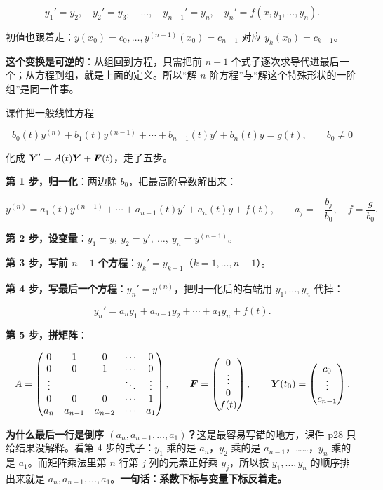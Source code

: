 \documentclass[11pt]{ctexart}
\newcommand{\mat}[1]{\begin{pmatrix}#1\end{pmatrix}}
\begin{document}
\[
y_1'=y_2,\quad y_2'=y_3,\quad\dots,\quad y_{n-1}'=y_n,\quad y_n'=f(x,y_1,\dots,y_n).
\]

初值也跟着走：$y(x_0)=c_0,\dots,y^{(n-1)}(x_0)=c_{n-1}$ 对应 $y_k(x_0)=c_{k-1}$。

\textbf{这个变换是可逆的}：从组回到方程，只需把前 $n-1$ 个式子逐次求导代进最后一个；从方程到组，就是上面的定义。所以“解 $n$ 阶方程”与“解这个特殊形状的一阶组”是同一件事。


课件把一般线性方程

\[
b_0(t)y^{(n)}+b_1(t)y^{(n-1)}+\cdots+b_{n-1}(t)y'+b_n(t)y=g(t),\qquad b_0\neq0
\]

化成 $\boldsymbol{Y}'=A(t)\boldsymbol{Y}+\boldsymbol{F}(t)$，走了五步。

\textbf{第 1 步，归一化}：两边除 $b_0$，把最高阶导数解出来：

\[
y^{(n)}=a_1(t)y^{(n-1)}+\cdots+a_{n-1}(t)y'+a_n(t)y+f(t),
\qquad a_j=-\frac{b_j}{b_0},\quad f=\frac{g}{b_0}.
\]

\textbf{第 2 步，设变量}：$y_1=y,\ y_2=y',\ \dots,\ y_n=y^{(n-1)}$。

\textbf{第 3 步，写前 $n-1$ 个方程}：$y_k'=y_{k+1}$（$k=1,\dots,n-1$）。

\textbf{第 4 步，写最后一个方程}：$y_n'=y^{(n)}$，把归一化后的右端用 $y_1,\dots,y_n$ 代掉：

\[
y_n'=a_n y_1+a_{n-1}y_2+\cdots+a_1y_n+f(t).
\]

\textbf{第 5 步，拼矩阵}：

\[
A=\begin{pmatrix}
0&1&0&\cdots&0\\
0&0&1&\cdots&0\\
\vdots& & &\ddots&\vdots\\
0&0&0&\cdots&1\\
a_n&a_{n-1}&a_{n-2}&\cdots&a_1
\end{pmatrix},
\qquad
\vect{F}=\mat{0\\ \vdots\\ 0\\ f(t)},\qquad
\vect{Y}(t_0)=\mat{c_0\\ \vdots\\ c_{n-1}}.
\]

\textbf{为什么最后一行是倒序 $(a_n,a_{n-1},\dots,a_1)$？}这是最容易写错的地方，课件 p28 只给结果没解释。看第 4 步的式子：$y_1$ 乘的是 $a_n$，$y_2$ 乘的是 $a_{n-1}$，……，$y_n$ 乘的是 $a_1$。而矩阵乘法里第 $n$ 行第 $j$ 列的元素正好乘 $y_j$，所以按 $y_1,\dots,y_n$ 的顺序排出来就是 $a_n,a_{n-1},\dots,a_1$。\textbf{一句话：系数下标与变量下标反着走。}
\end{document}
